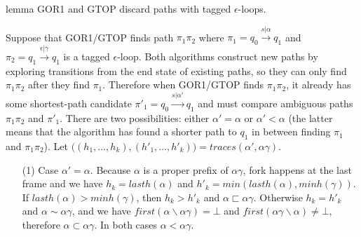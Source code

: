 \documentclass[AMA,STIX1COL]{WileyNJD-v2}
\begin{document}
\vspace{-0.5em}

\begin{theoremEnd}[restate, no link to proof, no link to theorem, category=lemmata_closure]{lemma}
    \label{lemma_closure_noloop}
    GOR1 and GTOP discard paths with tagged $\epsilon$-loops.
\end{theoremEnd}
\begin{proofEnd}
    Suppose that GOR1/GTOP finds path $\pi_1 \pi_2$
    where $\pi_1 = q_0 \overset {s | \alpha} {\longrightarrow} q_1$
    and $\pi_2 = q_1 \overset {\epsilon | \gamma} {\longrightarrow} q_1$ is a tagged $\epsilon$-loop.
    Both algorithms construct new paths by exploring transitions from the end state of existing paths,
    so they can only find $\pi_1 \pi_2$ after they find $\pi_1$.
    Therefore when GOR1/GTOP finds $\pi_1 \pi_2$,
    it already has some shortest-path candidate $\pi'_1 = q_0 \overset {s | \alpha'} {\longrightarrow} q_1$
    and must compare ambiguous paths $\pi_1 \pi_2$ and $\pi'_1$.
    There are two possibilities: either $\alpha' = \alpha$
    or $\alpha' < \alpha$ (the latter means that the algorithm has found
    a shorter path to $q_1$ in between finding $\pi_1$ and $\pi_1 \pi_2$).
    Let $\big( (h_1, \hdots, h_k), (h'_1, \hdots, h'_k) \big) = traces (\alpha', \alpha \gamma)$.
    \begin{itemize}[itemsep=0.2em, topsep=0.5em]
    \item[(1)]
        Case $\alpha' = \alpha$.
        Because $\alpha$ is a proper prefix of $\alpha \gamma$,
        fork happens at the last frame and we have
        $h_k = lasth(\alpha)$ and
        $h'_k = min (lasth(\alpha), minh(\gamma))$.
        If $lasth(\alpha) > minh(\gamma)$, then $h_k > h'_k$ and $\alpha \sqsubset \alpha \gamma$.
        Otherwise $h_k = h'_k$ and $\alpha \sim \alpha \gamma$,
        and we have $first(\alpha \backslash \alpha \gamma) = \bot$ and $first(\alpha \gamma \backslash \alpha) \neq \bot$,
        therefore $\alpha \subset \alpha \gamma$.
        In both cases $\alpha < \alpha \gamma$.


\end{itemize}
\end{proofEnd}
\end{document}
